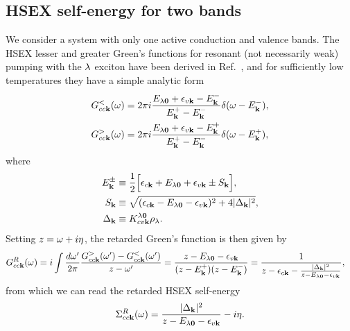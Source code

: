 \documentclass[twocolumn,aps,a4paper,superscriptaddress]{revtex4-2}
\begin{document}
\begin{widetext}
\section{HSEX self-energy for two bands}
\label{hsextwobandapp}

We consider a system with only one active conduction and valence
bands. The HSEX lesser and greater Green's functions for
resonant (not necessarily weak) pumping with the $\lambda$
exciton have been derived in Ref.~\cite{perfetto_pump-driven_2019}, and
for sufficiently low temperatures they have a simple analytic form
\begin{subequations}
\begin{align}
G^{<}_{cc{\mathbf k}}(\omega)&=2\pi i
\frac{E_{\lambda\mathbf 0}+\epsilon_{v{\mathbf k}}-E^{-}_{{\mathbf k}}}
{E^{+}_{{\mathbf k}}-E^{-}_{{\mathbf k}}}
\delta(\omega-E^{-}_{{\mathbf k}}),
\label{G<ccprm}
\\
G^{>}_{cc{\mathbf k}}(\omega)&=2\pi i \frac{E_{\lambda\mathbf 0}+\epsilon_{v{\mathbf k}}-E^{+}_{{\mathbf k}}}
{E^{+}_{{\mathbf k}}-E^{-}_{{\mathbf k}}}
\delta(\omega-E^{+}_{{\mathbf k}}),
\label{G>ccprm}
\end{align}
\label{Gccprm}
\end{subequations}
where
\begin{subequations}
\begin{align}
E^{\pm}_{{\mathbf k}}&\equiv \frac{1}{2}\Big[
\epsilon_{c{\mathbf k}}+E_{\lambda\mathbf 0}+\epsilon_{v{\mathbf k}}
\pm S_{{\mathbf k}}\Big],
\label{Eplusminus}
\\
S_{{\mathbf k}}&\equiv\sqrt{(\epsilon_{c{\mathbf k}}-E_{\lambda\mathbf 0}-\epsilon_{v{\mathbf k}})^{2}
+4|\Delta_{{\mathbf k}}|^{2}},
\\
\Delta_{{\mathbf k}}&\equiv K^{\lambda\mathbf 0}_{cv{\mathbf k}}\rho_{\lambda}.
\end{align}
\end{subequations}
Setting $z=\omega+i\eta$, the retarded Green's function is then given by
\begin{align}
G^{R}_{cc{\mathbf k}}(\omega)&=i\int\frac{d\omega'}{2\pi}
\frac{G^{>}_{cc{\mathbf k}}(\omega')-G^{<}_{cc{\mathbf k}}(\omega')}{z-\omega'}
=\frac{z-E_{\lambda\mathbf 0}-\epsilon_{v{\mathbf k}}}{
(z-E^{+}_{{\mathbf k}})(z-E^{-}_{{\mathbf k}})}
=\frac{1}{z-\epsilon_{c{\mathbf k}}-\frac{|\Delta_{{\mathbf k}}|^{2}}{z-E_{\lambda\mathbf 0}-\epsilon_{v{\mathbf k}}}},
\label{GRanalyt2}
\end{align}
from which we can read the retarded HSEX self-energy
\begin{align}
\Sigma^{R}_{cc{\mathbf k}}(\omega)=\frac{|\Delta_{{\mathbf k}}|^{2}}{z-E_{\lambda\mathbf 0}-\epsilon_{v{\mathbf k}}}-i\eta.
\label{twobself}
\end{align}


\end{widetext}
\end{document}
